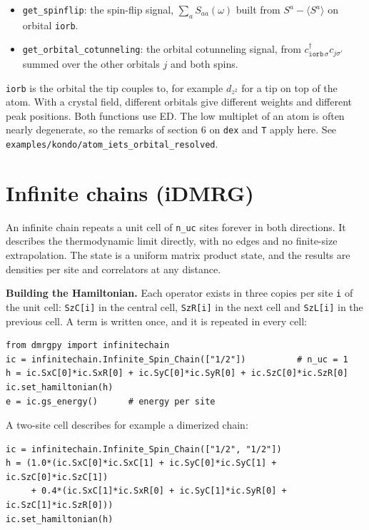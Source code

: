 \documentclass[11pt]{article}
\providecommand{\tightlist}{\setlength{\itemsep}{0pt}\setlength{\parskip}{0pt}}
\begin{document}
\begin{itemize}
\tightlist
\item
  \texttt{get\_\allowbreak{}spinflip}: the spin-flip signal, \(\sum_aS_{aa}(\omega)\) built from
  \(S^a-\langle S^a\rangle\) on orbital \texttt{iorb}.
\item
  \texttt{get\_\allowbreak{}orbital\_\allowbreak{}cotunneling}: the orbital cotunneling signal, from
  \(c^\dagger_{\texttt{iorb}\,\sigma}c_{j\sigma'}\) summed over the other
  orbitals \(j\) and both spins.
\end{itemize}

\texttt{iorb} is the orbital the tip couples to, for example \(d_{z^2}\) for a tip
on top of the atom. With a crystal field, different orbitals give
different weights and different peak positions. Both functions use ED.
The low multiplet of an atom is often nearly degenerate, so the remarks
of section 6 on \texttt{dex} and \texttt{T} apply here. See
\texttt{examples/kondo/atom\_\allowbreak{}iets\_\allowbreak{}orbital\_\allowbreak{}resolved}.

\section{Infinite chains (iDMRG)}

An infinite chain repeats a unit cell of \texttt{n\_\allowbreak{}uc} sites forever in both
directions. It describes the thermodynamic limit directly, with no edges
and no finite-size extrapolation. The state is a uniform matrix product
state, and the results are densities per site and correlators at any
distance.

\textbf{Building the Hamiltonian.} Each operator exists in three copies per
site \texttt{i} of the unit cell: \texttt{SzC{[}i{]}} in the central cell, \texttt{SzR{[}i{]}} in the
next cell and \texttt{SzL{[}i{]}} in the previous cell. A term is written once, and
it is repeated in every cell:

\begin{lstlisting}
from dmrgpy import infinitechain
ic = infinitechain.Infinite_Spin_Chain(["1/2"])          # n_uc = 1
h = ic.SxC[0]*ic.SxR[0] + ic.SyC[0]*ic.SyR[0] + ic.SzC[0]*ic.SzR[0]
ic.set_hamiltonian(h)
e = ic.gs_energy()      # energy per site
\end{lstlisting}

A two-site cell describes for example a dimerized chain:

\begin{lstlisting}
ic = infinitechain.Infinite_Spin_Chain(["1/2", "1/2"])
h = (1.0*(ic.SxC[0]*ic.SxC[1] + ic.SyC[0]*ic.SyC[1] + ic.SzC[0]*ic.SzC[1])
     + 0.4*(ic.SxC[1]*ic.SxR[0] + ic.SyC[1]*ic.SyR[0] + ic.SzC[1]*ic.SzR[0]))
ic.set_hamiltonian(h)
\end{lstlisting}
\end{document}

